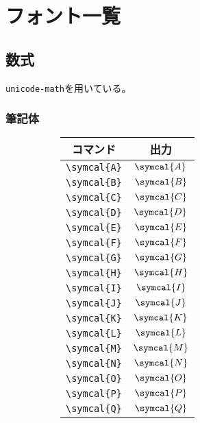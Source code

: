 \chapter{フォント一覧}

\section{数式}

\verb|unicode-math|を用いている。

\subsection{筆記体}

\begin{figure}[htbp]
    \centering
    \begin{subfigure}{.5\textwidth}
        \centering
        \begin{tabular}{cc}
            \toprule
            コマンド          & 出力           \\
            \midrule
            \verb|\symcal{A}| & \(\symcal{A}\) \\
            \verb|\symcal{B}| & \(\symcal{B}\) \\
            \verb|\symcal{C}| & \(\symcal{C}\) \\
            \verb|\symcal{D}| & \(\symcal{D}\) \\
            \verb|\symcal{E}| & \(\symcal{E}\) \\
            \verb|\symcal{F}| & \(\symcal{F}\) \\
            \verb|\symcal{G}| & \(\symcal{G}\) \\
            \verb|\symcal{H}| & \(\symcal{H}\) \\
            \verb|\symcal{I}| & \(\symcal{I}\) \\
            \verb|\symcal{J}| & \(\symcal{J}\) \\
            \verb|\symcal{K}| & \(\symcal{K}\) \\
            \verb|\symcal{L}| & \(\symcal{L}\) \\
            \verb|\symcal{M}| & \(\symcal{M}\) \\
            \verb|\symcal{N}| & \(\symcal{N}\) \\
            \verb|\symcal{O}| & \(\symcal{O}\) \\
            \verb|\symcal{P}| & \(\symcal{P}\) \\
            \verb|\symcal{Q}| & \(\symcal{Q}\) \\

\end{tabular}
\end{subfigure}
\end{figure}
